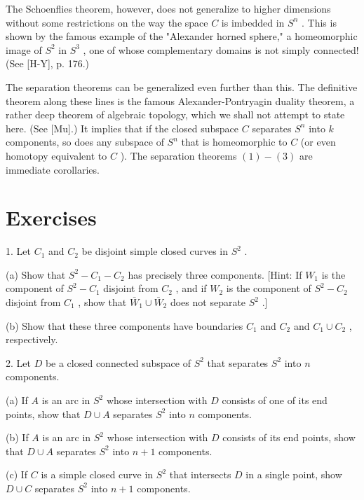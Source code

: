 \documentclass[10pt]{article}
\begin{document}
The Schoenflies theorem, however, does not generalize to higher dimensions without some restrictions on the way the space \(C\) is imbedded in \({S}^{n}\) . This is shown by the famous example of the "Alexander horned sphere," a homeomorphic image of \({S}^{2}\) in \({S}^{3}\) , one of whose complementary domains is not simply connected! (See [H-Y], p. 176.)

The separation theorems can be generalized even further than this. The definitive theorem along these lines is the famous Alexander-Pontryagin duality theorem, a rather deep theorem of algebraic topology, which we shall not attempt to state here. (See [Mu].) It implies that if the closed subspace \(C\) separates \({S}^{n}\) into \(k\) components, so does any subspace of \({S}^{n}\) that is homeomorphic to \(C\) (or even homotopy equivalent to \(C\) ). The separation theorems \(\left( 1\right)  - \left( 3\right)\) are immediate corollaries.

\section*{Exercises}

1. Let \({C}_{1}\) and \({C}_{2}\) be disjoint simple closed curves in \({S}^{2}\) .

(a) Show that \({S}^{2} - {C}_{1} - {C}_{2}\) has precisely three components. [Hint: If \({W}_{1}\) is the component of \({S}^{2} - {C}_{1}\) disjoint from \({C}_{2}\) , and if \({W}_{2}\) is the component of \({S}^{2} - {C}_{2}\) disjoint from \({C}_{1}\) , show that \({\bar{W}}_{1} \cup  {\bar{W}}_{2}\) does not separate \({S}^{2}\) .]

(b) Show that these three components have boundaries \({C}_{1}\) and \({C}_{2}\) and \({C}_{1} \cup  {C}_{2}\) , respectively.

2. Let \(D\) be a closed connected subspace of \({S}^{2}\) that separates \({S}^{2}\) into \(n\) components.

(a) If \(A\) is an arc in \({S}^{2}\) whose intersection with \(D\) consists of one of its end points, show that \(D \cup  A\) separates \({S}^{2}\) into \(n\) components.

(b) If \(A\) is an arc in \({S}^{2}\) whose intersection with \(D\) consists of its end points, show that \(D \cup  A\) separates \({S}^{2}\) into \(n + 1\) components.

(c) If \(C\) is a simple closed curve in \({S}^{2}\) that intersects \(D\) in a single point, show \(D \cup  C\) separates \({S}^{2}\) into \(n + 1\) components.
\end{document}
